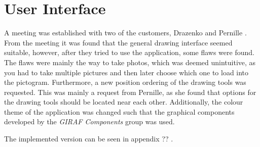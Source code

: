 \section{User Interface}
A meeting was established with two of the customers, Drazenko and Pernille \citep{misc:drazenko, misc:pernille}.
From the meeting it was found that the general drawing interface seemed suitable, however, after they tried to use the application, some flaws were found.
The flaws were mainly the way to take photos, which was deemed unintuitive, as you had to take multiple pictures and then later choose which one to load into the pictogram.
Furthermore, a new position ordering of the drawing tools was requested.
This was mainly a request from Pernille, as she found that options for the drawing tools should be located near each other.
Additionally, the colour theme of the application was changed such that the graphical components developed by the \textit{GIRAF Components} group was used.

The implemented version can be seen in appendix ?? .


